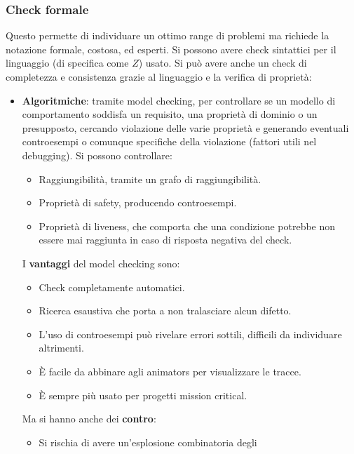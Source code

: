 \subsubsection{Check formale}
Questo permette di individuare un ottimo range di problemi ma richiede la notazione
formale, costosa, ed esperti. Si possono avere check sintattici per il linguaggio
(di specifica come $Z$) usato. Si può avere anche un check di completezza e
consistenza grazie al linguaggio e la verifica di proprietà:
\begin{itemize}
      \item \textbf{Algoritmiche}: tramite model checking, per controllare se un modello di
            comportamento soddisfa un requisito, una proprietà di dominio o un
            presupposto, cercando violazione delle varie proprietà e generando
            eventuali controesempi o comunque specifiche della violazione
            (fattori utili nel debugging). Si possono controllare:
            \begin{itemize}
                  \item Raggiungibilità, tramite un grafo di raggiungibilità.
                  \item Proprietà di safety, producendo controesempi.
                  \item Proprietà di liveness, che comporta che una condizione
                        potrebbe non essere mai raggiunta in caso di risposta
                        negativa del check.
            \end{itemize}
            I \textbf{vantaggi} del model checking sono:
            \begin{itemize}
                  \item Check completamente automatici.
                  \item Ricerca esaustiva che porta a non tralasciare alcun
                        difetto.
                  \item L'uso di controesempi può rivelare errori sottili,
                        difficili da individuare altrimenti.
                  \item È facile da abbinare agli animators per visualizzare le
                        tracce.
                  \item È sempre più usato per progetti mission critical.
            \end{itemize}
            Ma si hanno anche dei \textbf{contro}:
            \begin{itemize}
                  \item Si rischia di avere un'esplosione combinatoria degli

\end{itemize}
\end{itemize}
